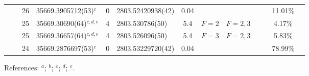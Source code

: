 \begin{table*}
\begin{center}
{\begin{tabular}{:l;l;c;l;c;l;c;l;l;c;c;c;c}
\rowstyle{\itshape}               &        & 26        & 35669.3905712(53)$^{c}$          & 0 & 2803.52420938(42)  & 0.04 & $                                        $ & $                                        $ & $      $ &              & 11.01\%   & $          $\\
\rowstyle{\itshape}               &        & 25        & 35669.30690(64)$^{c,d,e}$        & 4 &   2803.530786(50)  &  5.4 & $F=2                                     $ & $F=2,3                                   $ & $      $ &              & 4.17\%    & $          $\\
\rowstyle{\itshape}               &        & 25        & 35669.36657(64)$^{c,d,e}$        & 4 &   2803.526096(50)  &  5.4 & $F=3                                     $ & $F=2,3                                   $ & $      $ &              & 5.83\%    & $          $\\
\rowstyle{\itshape}               &        & 24        & 35669.2876697(53)$^{c}$          & 0 & 2803.53229720(42)  & 0.04 & $                                        $ & $                                        $ & $      $ &              & 78.99\%   & $          $\\
\hline
\end{tabular}
}
{\footnotesize References:
$^{a}$\citet{Hannemann:2006:012505};
$^{b}$\citet{Salumbides:2006:L41};
$^{c}$\citet{Batteiger:2009:022503};
$^{d}$\citet{Itano:1981:1364};
$^{e}$\citet{Sur:2005:25}.}
\end{center}
\end{table*}
